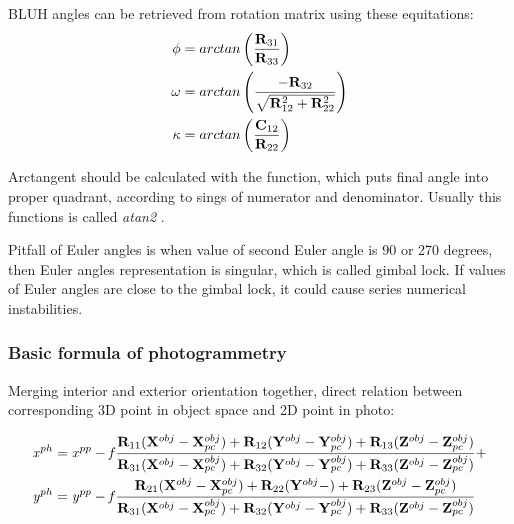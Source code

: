\documentclass[a4paper,12pt]{article}
\newcommand{\ematr}[1]{
{\bf #1}
}
\newcommand{\evect}[1]{
{\bf #1}
}
\newcommand{\escal}[1]{
{\it #1}
}
\newcommand{\term}[1]{
{\it #1}
}
\begin{document}
BLUH angles can be retrieved from rotation matrix using these equitations: 
 \begin{equation}
 \begin{split}
\escal{\phi} &=  arctan \left(\frac{\ematr{R}_{31}}{\ematr{R}_{33}} \right)\\
\escal{\omega} &= arctan \left(\frac{-\ematr{R}_{32}}{ \sqrt{ \ematr{R}_{12}^{2} + \ematr{R}_{22}^{2} }} \right)\\
\escal{\kappa} &=  arctan \left(\frac{\ematr{C}_{12}}{\ematr{R}_{22}} \right)
\end{split}
\end{equation}


Arctangent should be calculated with the function, which puts final angle into proper quadrant, according to sings of numerator 
and denominator. Usually this functions is called \term{atan2}. 

Pitfall of Euler angles is when value of second Euler angle is 90 or 270 degrees,  
then Euler angles representation is singular, which is called gimbal lock. 
If values  of Euler angles are close to the gimbal lock, it could cause series numerical instabilities.

\subsubsection{Basic formula of photogrammetry}

Merging interior and exterior orientation together, direct relation between corresponding 3D point in object space and 2D point
in photo:

\begin{equation}
\label{eq:col_eqs}
\begin{split}
&\escal{x}^{ph} = \escal{x}^{pp} -\escal{f}\frac{\ematr{R}_{11}(\evect{X}^{obj} - \evect{X}^{obj}_{pc}) + 
                                  \ematr{R}_{12}(\evect{Y}^{obj} - \evect{Y}^{obj}_{pc}) + 
                                  \ematr{R}_{13}(\evect{Z}^{obj} - \evect{Z}^{obj}_{pc})                                  
                                  }{
				  \ematr{R}_{31}(\evect{X}^{obj} - \evect{X}^{obj}_{pc}) + 
                                  \ematr{R}_{32}(\evect{Y}^{obj} - \evect{Y}^{obj}_{pc}) + 
                                  \ematr{R}_{33}(\evect{Z}^{obj} - \evect{Z}^{obj}_{pc})     
                                  } +  \\
&\escal{y}^{ph} = \escal{y}^{pp} -\escal{f}\frac{\ematr{R}_{21}(\evect{X}^{obj} - \evect{X}^{obj}_{pc}) + 
                                  \ematr{R}_{22}(\evect{Y}^{obj} - ) + 
                                  \ematr{R}_{23}(\evect{Z}^{obj} - \evect{Z}^{obj}_{pc})                                  
                                  }{
				  \ematr{R}_{31}(\evect{X}^{obj} - \evect{X}^{obj}_{pc}) + 
                                  \ematr{R}_{32}(\evect{Y}^{obj} - \evect{Y}^{obj}_{pc}) + 
                                  \ematr{R}_{33}(\evect{Z}^{obj} - \evect{Z}^{obj}_{pc})     
                                  }
\end{split}
\end{equation}
\end{document}

